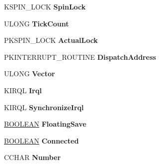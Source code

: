 \begin{DoxyCompactItemize}
K\+S\+P\+I\+N\+\_\+\+L\+O\+CK {\bfseries Spin\+Lock}
\item 
\mbox{\label{struct___k_i_n_t_e_r_r_u_p_t_aa63a3acbf6d3f1a9349353a309fa6bca}} 
U\+L\+O\+NG {\bfseries Tick\+Count}
\item 
\mbox{\label{struct___k_i_n_t_e_r_r_u_p_t_aa7aaf9006db5518f5ba51340eed75b10}} 
P\+K\+S\+P\+I\+N\+\_\+\+L\+O\+CK {\bfseries Actual\+Lock}
\item 
\mbox{\label{struct___k_i_n_t_e_r_r_u_p_t_a3cba15a02a9217ba160fdce5f243e3de}} 
P\+K\+I\+N\+T\+E\+R\+R\+U\+P\+T\+\_\+\+R\+O\+U\+T\+I\+NE {\bfseries Dispatch\+Address}
\item 
\mbox{\label{struct___k_i_n_t_e_r_r_u_p_t_a6d228b3ca3c2211cb3f8e38b5db5ceec}} 
U\+L\+O\+NG {\bfseries Vector}
\item 
\mbox{\label{struct___k_i_n_t_e_r_r_u_p_t_a8d53324a7a54b97faf639014e93f50f9}} 
K\+I\+R\+QL {\bfseries Irql}
\item 
\mbox{\label{struct___k_i_n_t_e_r_r_u_p_t_a0ecbadd1cced88d7b2b247419d89d29a}} 
K\+I\+R\+QL {\bfseries Synchronize\+Irql}
\item 
\mbox{\label{struct___k_i_n_t_e_r_r_u_p_t_a98db006a52e50e4bc09e957971a4a6e3}} 
\hyperlink{_processor_bind_8h_a112e3146cb38b6ee95e64d85842e380a}{B\+O\+O\+L\+E\+AN} {\bfseries Floating\+Save}
\item 
\mbox{\label{struct___k_i_n_t_e_r_r_u_p_t_a498bc56e0092191a7889ec4c1bc04376}} 
\hyperlink{_processor_bind_8h_a112e3146cb38b6ee95e64d85842e380a}{B\+O\+O\+L\+E\+AN} {\bfseries Connected}
\item 
\mbox{\label{struct___k_i_n_t_e_r_r_u_p_t_a1c68c216a91a3ac8f93a6091153b3e04}} 
C\+C\+H\+AR {\bfseries Number}
\item 
\mbox{\label{struct___k_i_n_t_e_r_r_u_p_t_a5ed74404021877c4fe9fa01121a6e08c}} 

\end{DoxyCompactItemize}
